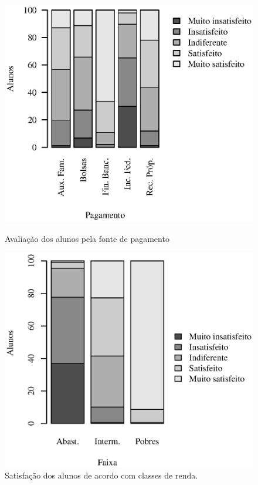 \documentclass[10pt,a4paper,oneside]{article}
\begin{document}
\begin{figure}[h]
\begin{minipage}{0.49\textwidth}
	\includegraphics[width=\linewidth]{plots/stacked_opiniao_por_pagamento.eps}
	\caption{Avaliação dos alunos pela fonte de pagamento}
	\label{figure: avaliacao por fonte de pagamento}
\end{minipage}
%
\begin{minipage}{0.49\textwidth}
	\includegraphics[width=\linewidth]{plots/stacked_opiniao_por_faixaRenda.eps}
	\caption{Satisfação dos alunos de acordo com classes de renda.}
	\label{fig:satisfacao-renda}
\end{minipage}
\end{figure}
\end{document}
